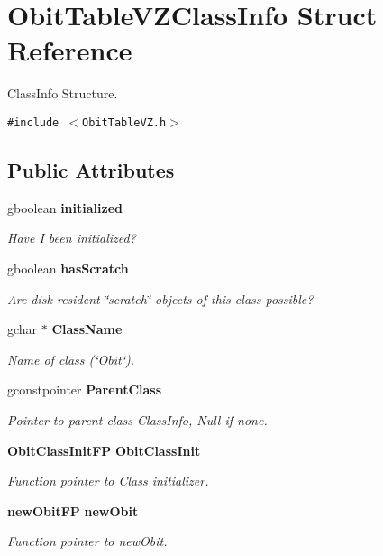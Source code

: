 \section{Obit\-Table\-VZClass\-Info Struct Reference}
\label{structObitTableVZClassInfo}
Class\-Info Structure.  


{\tt \#include $<$Obit\-Table\-VZ.h$>$}

\subsection*{Public Attributes}
\begin{CompactItemize}
\item 
gboolean {\bf initialized}
\begin{CompactList}\small\item\em Have I been initialized? \item\end{CompactList}\item 
gboolean {\bf has\-Scratch}
\begin{CompactList}\small\item\em Are disk resident \char`\"{}scratch\char`\"{} objects of this class possible? \item\end{CompactList}\item 
gchar $\ast$ {\bf Class\-Name}
\begin{CompactList}\small\item\em Name of class (\char`\"{}Obit\char`\"{}). \item\end{CompactList}\item 
gconstpointer {\bf Parent\-Class}
\begin{CompactList}\small\item\em Pointer to parent class Class\-Info, Null if none. \item\end{CompactList}\item 
{\bf Obit\-Class\-Init\-FP} {\bf Obit\-Class\-Init}
\begin{CompactList}\small\item\em Function pointer to Class initializer. \item\end{CompactList}\item 
{\bf new\-Obit\-FP} {\bf new\-Obit}
\begin{CompactList}\small\item\em Function pointer to new\-Obit. \item\end{CompactList}\item 

\end{CompactItemize}
